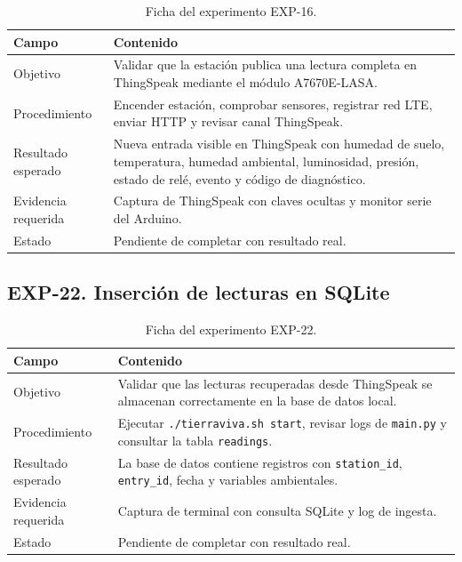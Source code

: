 \begin{table}[H]
\centering
\renewcommand{\arraystretch}{1.25}
\small
\begin{tabular}{|p{}|p{}|}
\hline
\rowcolor{gray!20}
\textbf{Campo} & \textbf{Contenido} \\
\hline
Objetivo & Validar que la estación publica una lectura completa en ThingSpeak mediante el módulo A7670E-LASA. \\
\hline
Procedimiento & Encender estación, comprobar sensores, registrar red LTE, enviar HTTP y revisar canal ThingSpeak. \\
\hline
Resultado esperado & Nueva entrada visible en ThingSpeak con humedad de suelo, temperatura, humedad ambiental, luminosidad, presión, estado de relé, evento y código de diagnóstico. \\
\hline
Evidencia requerida & Captura de ThingSpeak con claves ocultas y monitor serie del Arduino. \\
\hline
Estado & Pendiente de completar con resultado real. \\
\hline
\end{tabular}
\caption{Ficha del experimento EXP-16.}
\label{tab:ficha_exp_16}
\end{table}

\subsection{EXP-22. Inserción de lecturas en SQLite}

\begin{table}[H]
\centering
\renewcommand{\arraystretch}{1.25}
\small
\begin{tabular}{|p{}|p{}|}
\hline
\rowcolor{gray!20}
\textbf{Campo} & \textbf{Contenido} \\
\hline
Objetivo & Validar que las lecturas recuperadas desde ThingSpeak se almacenan correctamente en la base de datos local. \\
\hline
Procedimiento & Ejecutar \texttt{./tierraviva.sh start}, revisar logs de \texttt{main.py} y consultar la tabla \texttt{readings}. \\
\hline
Resultado esperado & La base de datos contiene registros con \texttt{station\_id}, \texttt{entry\_id}, fecha y variables ambientales. \\
\hline
Evidencia requerida & Captura de terminal con consulta SQLite y log de ingesta. \\
\hline
Estado & Pendiente de completar con resultado real. \\
\hline
\end{tabular}
\caption{Ficha del experimento EXP-22.}
\label{tab:ficha_exp_22}
\end{table}

